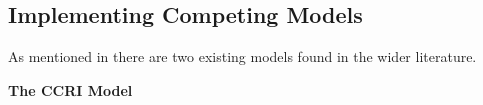 
\subsection{Implementing Competing Models}

As mentioned in  there are two existing models found in the wider literature. 

\textbf{The CCRI Model} 

